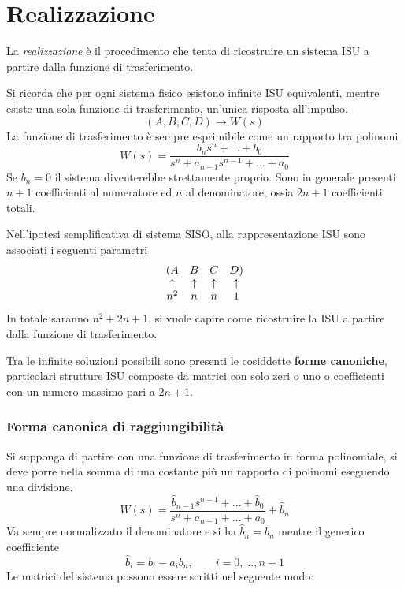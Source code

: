 \newpage
\section{Realizzazione}
La \textit{realizzazione} è il procedimento che tenta di ricostruire un sistema
ISU a partire dalla funzione di trasferimento.

Si ricorda che per ogni sistema fisico esistono infinite ISU equivalenti,
mentre esiste una sola funzione di trasferimento, un'unica risposta all'impulso.
$$
(A,B,C,D) \longrightarrow W(s)
$$
La funzione di trasferimento è sempre esprimibile come un rapporto tra polinomi
$$
W(s) = \frac{b_ns^n+\ldots + b_0}
{s^n + a_{n-1}s^{n-1} + \ldots + a_0}
$$
Se $b_n=0$ il sistema diventerebbe strettamente proprio.
Sono in generale presenti $n+1$ coefficienti al numeratore ed $n$ al
denominatore, ossia $2n+1$ coefficienti totali.

Nell'ipotesi semplificativa di sistema SISO, alla rappresentazione ISU sono
associati i seguenti parametri
$$\begin{array}{*4c}
 (A & B & C & D) \\
 \uparrow  &\uparrow & \uparrow & \uparrow \\
 n^2 & n & n & 1
\end{array}$$
In totale saranno $n^2 + 2n + 1$, si vuole capire come ricostruire la ISU a
partire dalla funzione di trasferimento.

Tra le infinite soluzioni possibili sono presenti le cosiddette \textbf{forme
canoniche}, particolari strutture ISU composte da matrici con solo zeri o uno o
coefficienti con un numero massimo pari a $2n+1$.

\subsubsection{Forma canonica di raggiungibilità}

Si supponga di partire con una funzione di trasferimento in forma polinomiale,
si deve porre nella somma di una costante più un rapporto di polinomi eseguendo
una divisione.
$$
W(s) = \frac{\hat{b}_{n-1}s^{n-1} + \ldots + \hat{b}_0}
{s^n +a_{n-1} + \ldots + a_0}
+ \hat{b}_n$$
Va sempre normalizzato il denominatore e si ha $\hat{b}_n = b_n$ mentre il
generico coefficiente
$$
\hat{b}_i = b_i - a_ib_n, \qquad i=0,\ldots,n-1
$$
Le matrici del sistema possono essere scritti nel seguente modo:

